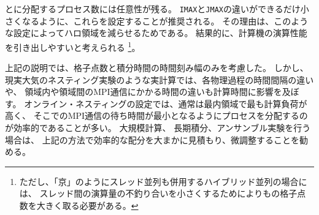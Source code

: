 {\XDIR} と{\YDIR}に分配するプロセス数には任意性が残る。
\verb|IMAX|と\verb|JMAX|の違いができるだけ小さくなるように、これらを設定することが推奨される。
その理由は、このような設定によってハロ領域を減らせるためである。
結果的に、計算機の演算性能を引き出しやすいと考えられる
\footnote{ただし、「京」のようにスレッド並列も併用するハイブリッド並列の場合には、
スレッド間の演算量の不釣り合いを小さくするために{\XDIR}よりも{\YDIR}の格子点数を大きく取る必要がある。}。


上記の説明では、格子点数と積分時間の時間刻み幅のみを考慮した。
しかし、現実大気のネスティング実験のような実計算では、各物理過程の時間間隔の違いや、
領域内や領域間のMPI通信にかかる時間の違いも計算時間に影響を及ぼす。
オンライン・ネスティングの設定では、通常は最内領域で最も計算負荷が高く、
そこでのMPI通信の待ち時間が最小となるようにプロセスを分配するのが効率的であることが多い。
大規模計算、 長期積分、アンサンブル実験を行う場合は、
上記の方法で効率的な配分を大まかに見積もり、微調整することを勧める。
